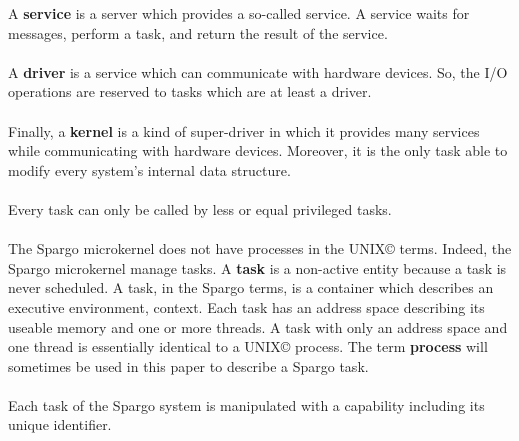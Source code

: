 \documentclass[10pt,a4wide]{article}
\begin{document}
\begin{multicols}{2}
A \textbf{service} is a server which provides a so-called service. A service
waits for messages, perform a task, and return the result of the service.

\paragraph{}

A \textbf{driver} is a service which can communicate with hardware devices.
So, the I/O operations are reserved to tasks which are at least a driver.

\paragraph{}

Finally, a \textbf{kernel} is a kind of super-driver in which it provides
many services while communicating with hardware devices. Moreover, it is
the only task able to modify every system's internal data structure.

\paragraph{}

Every task can only be called by less or equal privileged tasks.

\paragraph{}

The Spargo microkernel does not have processes in the
UNIX{\scriptsize \copyright} terms. Indeed, the Spargo microkernel manage tasks.
A \textbf{task} is a non-active entity because a task is never scheduled.
A task, in the Spargo terms, is a container which describes an executive
environment, context. Each task has an address space describing its useable
memory and one or more threads. A task with only an address space and one
thread is essentially identical to a UNIX{\scriptsize \copyright} process.
The term \textbf{process} will sometimes be used in this paper to describe
a Spargo task.

\paragraph{}

Each task of the Spargo system is manipulated with a capability including
its unique identifier.

\paragraph{}


\end{multicols}
\end{document}
